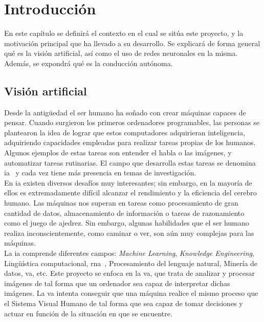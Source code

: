 \chapter{Introducción}\label{cap.introduccion}

En este capítulo se definirá el contexto en el cual se sitúa este proyecto, y la motivación principal que ha llevado a su desarrollo. Se explicará de forma general qué es la visión artificial, así como el uso de redes neuronales en la misma. Además, se expondrá qué es la conducción autónoma.

\section{Visión artificial}

Desde la antigüedad el ser humano ha soñado con crear máquinas capaces de pensar. Cuando surgieron los primeros ordenadores programables, las personas se plantearon la idea de lograr que estos computadores adquirieran inteligencia, adquiriendo capacidades empleadas para realizar tareas propias de los humanos. Algunos ejemplos de estas tareas son entender el habla o las imágenes, y automatizar tareas rutinarias. El campo que desarrolla estas tareas se denomina \acrfull{ia}~\cite{Goodfellow} y cada vez tiene más presencia en temas de investigación.\\

En \acrshort{ia} existen diversos desafíos muy interesantes; sin embargo, en la mayoría de ellos es extremadamente difícil alcanzar el rendimiento y la eficiencia del cerebro humano. Las máquinas nos superan en tareas como procesamiento de gran cantidad de datos, almacenamiento de información o tareas de razonamiento como el juego de ajedrez. Sin embargo, algunas habilidades que el ser humano realiza inconscientemente, como caminar o ver, son aún muy complejas para las máquinas.\\

La \acrshort{ia} comprende diferentes campos: \textit{Machine Learning}, \textit{Knowledge Engineering}, Lingüística computacional, \acrfull{rna}~\cite{rna}, Procesamiento del lenguaje natural, Minería de datos, \acrfull{va}, etc. Este proyecto se enfoca en la \acrshort{va}, que trata de analizar y procesar imágenes de tal forma que un ordenador sea capaz de interpretar dichas imágenes. La \acrshort{va} intenta conseguir que una máquina realice el mismo proceso que el Sistema Visual Humano de tal forma que sea capaz de tomar decisiones y actuar en función de la situación en que se encuentre.\\

